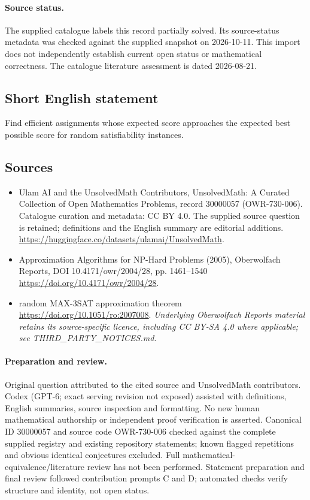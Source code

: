 \documentclass[11pt]{article}
\begin{document}
\paragraph{Source status.}
The supplied catalogue labels this record partially solved. Its source-status metadata was checked against the supplied snapshot on 2026-10-11. This import does not independently establish current open status or mathematical correctness. The catalogue literature assessment is dated 2026-08-21.
\subsection{Short English statement}
Find efficient assignments whose expected score approaches the expected best possible score for random satisfiability instances.
\subsection{Sources}
\begin{itemize}
\item[\hypertarget{source:30000057:1}{S1}] Ulam AI and the UnsolvedMath Contributors, UnsolvedMath: A Curated Collection of Open Mathematics Problems, record 30000057 (OWR-730-006). Catalogue curation and metadata: CC BY 4.0. The supplied source question is retained; definitions and the English summary are editorial additions.
\url{https://huggingface.co/datasets/ulamai/UnsolvedMath}.
\item[\hypertarget{source:30000057:2}{S2}] Approximation Algorithms for NP-Hard Problems (2005), Oberwolfach Reports, DOI 10.4171/owr/2004/28, pp. 1461--1540
\url{https://doi.org/10.4171/owr/2004/28}.
\item[\hypertarget{source:30000057:3}{S3}] random MAX-3SAT approximation theorem
\url{https://doi.org/10.1051/ro:2007008}.
\textit{Underlying Oberwolfach Reports material retains its source-specific licence, including CC BY-SA 4.0 where applicable; see THIRD\_PARTY\_NOTICES.md.}
\end{itemize}
\paragraph{Preparation and review.}
Original question attributed to the cited source and UnsolvedMath contributors. Codex (GPT-6; exact serving revision not exposed) assisted with definitions, English summaries, source inspection and formatting. No new human mathematical authorship or independent proof verification is asserted. Canonical ID 30000057 and source code OWR-730-006 checked against the complete supplied registry and existing repository statements; known flagged repetitions and obvious identical conjectures excluded. Full mathematical-equivalence/literature review has not been performed. Statement preparation and final review followed contribution prompts C and D; automated checks verify structure and identity, not open status.
\label{end:30000057}
\end{document}
